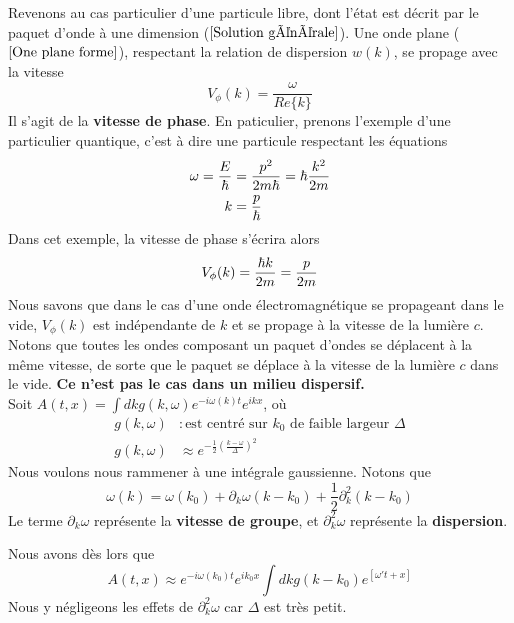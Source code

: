 \documentclass[../notesdecours]{subfiles}
\begin{document}
Revenons au cas particulier d'une particule libre, dont l'état est décrit par le paquet d'onde à une dimension ($\ref{Solution générale}$). Une onde plane ($\ref{One plane forme}$), respectant la relation de dispersion $w(k)$, se propage avec la vitesse
\begin{equation}
V_\phi (k) = \frac{\omega}{Re\{k\}}
\end{equation}
Il s'agit de la \textbf{vitesse de phase}. En paticulier, prenons l'exemple d'une particulier quantique, c'est à dire une particule respectant les équations
\begin{align}
\omega = \frac{E}{\hbar} &= \frac{p^2}{2m\hbar} = \hbar \frac{k^2}{2m}\\
k &= \frac{p}{\hbar}
\end{align}
Dans cet exemple, la vitesse de phase s'écrira alors
\begin{equation}
V_\phi (k) = \frac{\hbar k}{2m} = \frac{p}{2m}
\end{equation}
Nous savons que dans le cas d'une onde électromagnétique se propageant dans le vide, $V_\phi (k)$ est indépendante de $k$ et se propage à la vitesse de la lumière $c$. Notons que toutes les ondes composant un paquet d'ondes se déplacent à la même vitesse, de sorte que le paquet se déplace à la vitesse de la lumière $c$ dans le vide. \textbf{Ce n'est pas le cas dans un milieu dispersif.}\\

Soit $A(t,x) = \int dk g(k,\omega) e^{-i\omega(k)t}e^{ikx}$, où
\begin{align*}
g(k,\omega)&: \text{est centré sur $k_0$ de faible largeur $\Delta$}\\
g(k,\omega) &\approx e^{- \frac{1}{2}(\frac{k-\omega}{\Delta})^2}
\end{align*}
Nous voulons nous rammener à une intégrale gaussienne. Notons que 
\begin{equation}
\omega(k) = \omega (k_0) + \partial_k \omega (k-k_0) + \frac{1}{2}\partial_k^2(k-k_0)
\end{equation}
Le terme $\partial_k \omega$ représente la \textbf{vitesse de groupe}, et $\partial_k^2 \omega$ représente la \textbf{dispersion}.

Nous avons dès lors que
\begin{equation}
A(t,x) \approx e^{-i \omega(k_0)t}e^{ik_0x} \int dk g(k-k_0) e^{\left[\omega't+x\right]}
\end{equation}
Nous y négligeons les effets de $\partial_k^2 \omega$ car $\Delta$ est très petit.\\
\end{document}
